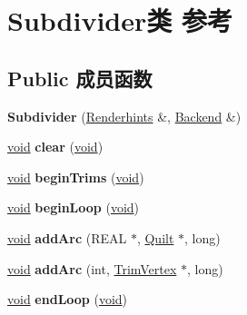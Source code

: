 \hypertarget{class_subdivider}{}\section{Subdivider类 参考}
\label{class_subdivider}
\subsection*{Public 成员函数}
\begin{DoxyCompactItemize}
\item 
\mbox{\label{class_subdivider_a0e26fa785d2fff1333bc556e86243d48}} 
{\bfseries Subdivider} (\hyperlink{class_renderhints}{Renderhints} \&, \hyperlink{class_backend}{Backend} \&)
\item 
\mbox{\label{class_subdivider_ace9ffef820df6561edd1ea0ebb680863}} 
\hyperlink{interfacevoid}{void} {\bfseries clear} (\hyperlink{interfacevoid}{void})
\item 
\mbox{\label{class_subdivider_aadacff8601d1748a176c589cea79dfb0}} 
\hyperlink{interfacevoid}{void} {\bfseries begin\+Trims} (\hyperlink{interfacevoid}{void})
\item 
\mbox{\label{class_subdivider_a801bc5ff9ced32a051ba33272b2e4e12}} 
\hyperlink{interfacevoid}{void} {\bfseries begin\+Loop} (\hyperlink{interfacevoid}{void})
\item 
\mbox{\label{class_subdivider_abe9cd5ecaae65f7bf9b7ede3a6ad4e88}} 
\hyperlink{interfacevoid}{void} {\bfseries add\+Arc} (R\+E\+AL $\ast$, \hyperlink{class_quilt}{Quilt} $\ast$, long)
\item 
\mbox{\label{class_subdivider_a85fadac7bba74bae6d14ade52fb1394f}} 
\hyperlink{interfacevoid}{void} {\bfseries add\+Arc} (int, \hyperlink{class_trim_vertex}{Trim\+Vertex} $\ast$, long)
\item 
\mbox{\label{class_subdivider_ad4ded1915775a5f65157265e49f8a34b}} 
\hyperlink{interfacevoid}{void} {\bfseries end\+Loop} (\hyperlink{interfacevoid}{void})
\item 
\mbox{\label{class_subdivider_a2545009b287b75627310e8ad93daf7c0}} 

\end{DoxyCompactItemize}
